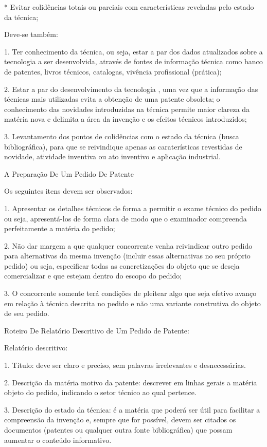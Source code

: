 \documentclass[12pt]{article}
\begin{document}
 * Evitar colidências totais ou parciais com características reveladas
 pelo estado da técnica;

 Deve-se também:
 
 1. Ter conhecimento da técnica, ou seja, estar a par dos dados
 atualizados sobre a tecnologia a ser desenvolvida, através de fontes
 de informação técnica como banco de patentes, livros técnicos,
 catalogas, vivência profissional (prática);
 
 2. Estar a par do desenvolvimento da tecnologia , uma vez que a
 informação das técnicas mais utilizadas evita a obtenção de uma
 patente obsoleta; o conhecimento das novidades introduzidas na
 técnica permite maior clareza da matéria nova e delimita a área da
 invenção e os efeitos técnicos introduzidos;
 
 3. Levantamento dos pontos de colidências com o estado da técnica
 (busca bibliográfica), para que se reivindique apenas as
 caraterísticas revestidas de novidade, atividade inventiva ou ato
 inventivo e aplicação industrial.
 
 A Preparação De Um Pedido De Patente
 
 Os seguintes itens devem ser observados:
 
 1. Apresentar os detalhes técnicos de forma a permitir o exame
 técnico do pedido ou seja, apresentá-los de forma clara de modo que o
 examinador compreenda perfeitamente a matéria do pedido;
 
 2. Não dar margem a que qualquer concorrente venha reivindicar outro
 pedido para alternativas da mesma invenção (incluir essas
 alternativas no seu próprio pedido) ou seja, especificar todas as
 concretizações do objeto que se deseja comercializar e que estejam
 dentro do escopo do pedido;
 
 3. O concorrente somente terá condições de pleitear algo que seja
 efetivo avanço em relação à técnica descrita no pedido e não uma
 variante construtiva do objeto de seu pedido.
 
 Roteiro De Relatório Descritivo de Um Pedido de Patente:

 Relatório descritivo:
 
 1. Título: deve ser claro e preciso, sem palavras irrelevantes e
 desnecessárias.
 
 2. Descrição da matéria motivo da patente: descrever em linhas gerais
 a matéria objeto do pedido, indicando o setor técnico ao qual
 pertence.
 
 3. Descrição do estado da técnica: é a matéria que poderá ser útil
 para facilitar a compreensão da invenção e, sempre que for possível,
 devem ser citados os documentos (patentes ou qualquer outra fonte
 bibliográfica) que possam aumentar o conteúdo informativo.
 
\end{document}
